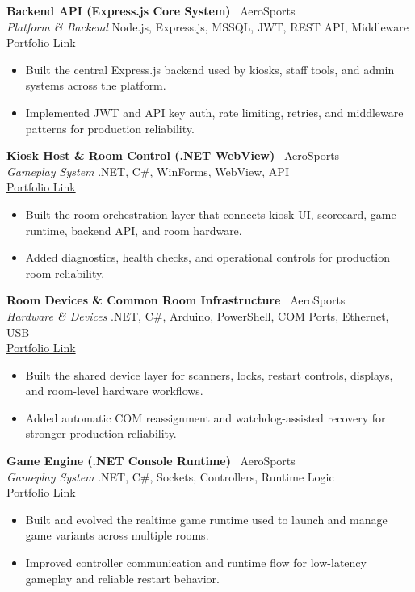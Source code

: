 \documentclass[a4paper,10pt]{article}
\begin{document}
\textbf{Backend API (Express.js Core System)} \textbar\ AeroSports \\
\textit{Platform \& Backend} \hfill Node.js, Express.js, MSSQL, JWT, REST API, Middleware
\\
\href{https://prabeshkunwar12.github.io/portfolio/developer/projects/backend-api-express}{Portfolio Link}
\begin{itemize}
    \item Built the central Express.js backend used by kiosks, staff tools, and admin systems across the platform.
    \item Implemented JWT and API key auth, rate limiting, retries, and middleware patterns for production reliability.
\end{itemize}
\textbf{Kiosk Host \& Room Control (.NET WebView)} \textbar\ AeroSports \\
\textit{Gameplay System} \hfill .NET, C\#, WinForms, WebView, API
\\
\href{https://prabeshkunwar12.github.io/portfolio/developer/projects/kiosk-host-dotnet}{Portfolio Link}
\begin{itemize}
    \item Built the room orchestration layer that connects kiosk UI, scorecard, game runtime, backend API, and room hardware.
    \item Added diagnostics, health checks, and operational controls for production room reliability.
\end{itemize}
\textbf{Room Devices \& Common Room Infrastructure} \textbar\ AeroSports \\
\textit{Hardware \& Devices} \hfill .NET, C\#, Arduino, PowerShell, COM Ports, Ethernet, USB
\\
\href{https://prabeshkunwar12.github.io/portfolio/developer/projects/room-devices-access-control}{Portfolio Link}
\begin{itemize}
    \item Built the shared device layer for scanners, locks, restart controls, displays, and room-level hardware workflows.
    \item Added automatic COM reassignment and watchdog-assisted recovery for stronger production reliability.
\end{itemize}
\textbf{Game Engine (.NET Console Runtime)} \textbar\ AeroSports \\
\textit{Gameplay System} \hfill .NET, C\#, Sockets, Controllers, Runtime Logic
\\
\href{https://prabeshkunwar12.github.io/portfolio/developer/projects/game-engine-dotnet}{Portfolio Link}
\begin{itemize}
    \item Built and evolved the realtime game runtime used to launch and manage game variants across multiple rooms.
    \item Improved controller communication and runtime flow for low-latency gameplay and reliable restart behavior.
\end{itemize}
\end{document}
